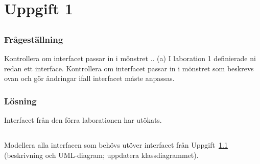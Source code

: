 %
%

\section{Uppgift 1}\label{sec:uppg01}

\subsection{}\label{uppg1a}
\subsubsection*{Frågeställning}
Kontrollera om interfacet passar in i mönstret ..
(a) I laboration 1 definierade ni redan ett interface. Kontrollera om interfacet
passar in i mönstret som beskrevs ovan och gör ändringar ifall interfacet måste
anpassas.
\subsubsection*{Lösning}
Interfacet från den förra laborationen har utökats.


\subsection{}\label{uppg1b}
\subsubsection*{}
Modellera alla interfacen som behövs utöver interfacet från Uppgift~\ref{uppg1a}
(beskrivning och UML-diagram; uppdatera klassdiagrammet).

\subsubsection*{}


\subsection{}
